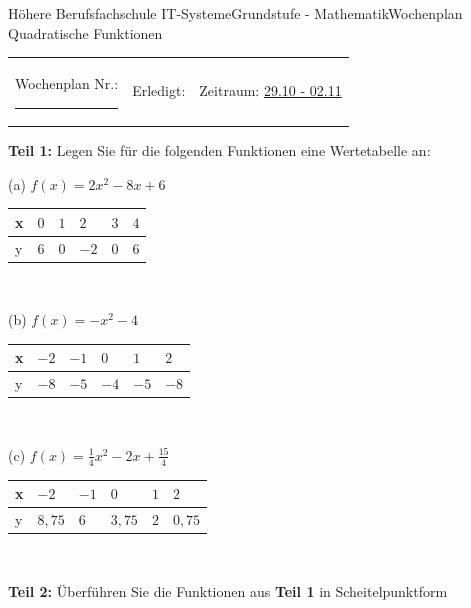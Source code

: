 \documentclass[oneside,openany,headings=optiontotoc,11pt,numbers=noenddot]{scrreprt}
\begin{document}
	\begin{worksheet}{Höhere Berufsfachschule IT-Systeme}{Grundstufe - Mathematik}{Wochenplan Quadratische Funktionen}
		\noindent
		\begin{tabularx}{\textwidth}{XXl}
			Wochenplan Nr.: \rule{0.15\textwidth}{1pt} & Erledigt: & Zeitraum: \underline{29.10 - 02.11}
		\end{tabularx}
	
		\begin{framed}
			\noindent
			\textbf{Teil 1:} Legen Sie für die folgenden Funktionen eine Wertetabelle an:\\
			\par\noindent
			(a) \(f(x) = 2x^2 - 8x +6\)\\
			\par\noindent
			\begin{tabularx}{\textwidth}{X|X|X|X|X|X}
				x & \(0\) & \(1\) & \(2\) & \(3\) & \(4\)\\
				\hline
				y & \(6\) & \(0\) & \(-2\) & \(0\) & \(6\)\\
			\end{tabularx}\\
			\par\noindent
			(b) \(f(x) = -x^2  -4\)\\
			\par\noindent
			\begin{tabularx}{\textwidth}{X|X|X|X|X|X}
				x & \(-2\) & \(-1\) & \(0\) & \(1\) & \(2\)\\
				\hline
				y & \(-8\) & \(-5\) & \(-4\) & \(-5\) & \(-8\)\\
			\end{tabularx}\\
			\par\noindent
			(c) \(f(x) = \frac{1}{4}x^2 -2x + \frac{15}{4}\)\\
			\par\noindent
			\begin{tabularx}{\textwidth}{X|X|X|X|X|X}
				x & \(-2\) & \(-1\) & \(0\) & \(1\) & \(2\)\\
				\hline
				y & \(8,75\) & \(6\) & \(3,75\) & \(2\) & \(0,75\)\\
			\end{tabularx}\\
		\end{framed}
		\begin{framed}
			\noindent
			\textbf{Teil 2:} Überführen Sie die Funktionen aus \textbf{Teil 1} in Scheitelpunktform\\

\end{framed}
\end{worksheet}
\end{document}
